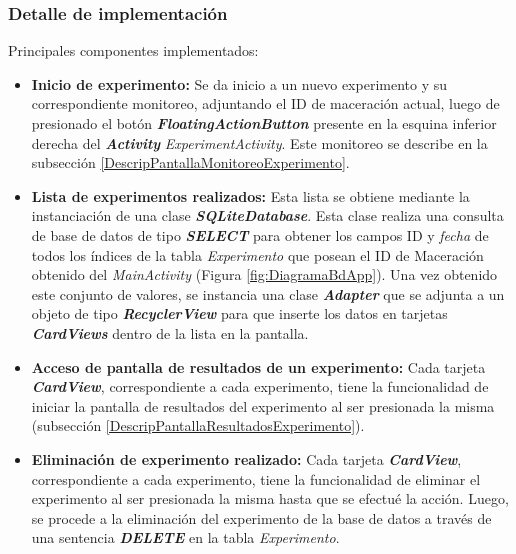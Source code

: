             \subsubsection{Detalle de implementación}
                \par Principales componentes implementados:
                \begin{itemize}
                    \item \textbf{Inicio de experimento:} Se da inicio a un nuevo experimento y su correspondiente monitoreo, adjuntando el ID de maceración actual, luego de presionado el botón \textbf{\textit{\gls{FloatingActionButton}}} presente en la esquina inferior derecha del \textbf{\textit{Activity}} \textit{ExperimentActivity}. Este monitoreo se describe en la subsección \ref{DescripPantallaMonitoreoExperimento}.
                    
                    \item \textbf{Lista de experimentos realizados:} Esta lista se obtiene mediante la instanciación de una clase \textbf{\textit{\gls{SQLiteDatabase}}}. Esta clase realiza una consulta de base de datos de tipo \textbf{\textit{\gls{SELECT}}} para obtener los campos ID y \textit{fecha} de todos los índices de la tabla \textit{Experimento} que posean el ID de Maceración obtenido del \textit{MainActivity}  (Figura \ref{fig:DiagramaBdApp}). Una vez obtenido este conjunto de valores, se instancia una clase \textbf{\textit{\gls{Adapter}}} que se adjunta a un objeto de tipo \textbf{\textit{\gls{RecyclerView}}} para que inserte los datos en tarjetas \textbf{\textit{\gls{CardView}s}} dentro de la lista en la pantalla. 
                    
                    \item \textbf{Acceso de pantalla de resultados de un experimento:} Cada tarjeta \textbf{\textit{\gls{CardView}}}, correspondiente a cada experimento, tiene la funcionalidad de iniciar la pantalla de resultados del experimento al ser presionada la misma (subsección \ref{DescripPantallaResultadosExperimento}).
                  
                    \item \textbf{Eliminación de experimento realizado:} Cada tarjeta \textbf{\textit{\gls{CardView}}}, correspondiente a cada experimento, tiene la funcionalidad de eliminar el experimento al ser presionada la misma hasta que se efectué la acción. Luego, se procede a la eliminación del experimento de la base de datos a través de una sentencia \textbf{\textit{\gls{DELETE}}} en la tabla \textit{Experimento}.
                    

\end{itemize}
